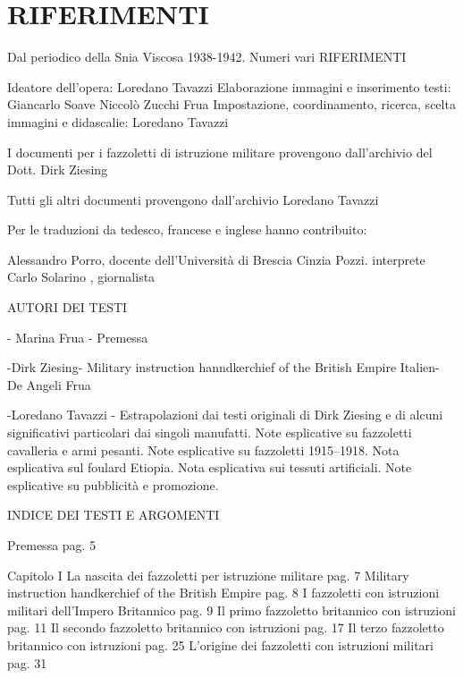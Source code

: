 \chapter[]{RIFERIMENTI}

Dal periodico della Snia Viscosa 1938-1942. Numeri vari
RIFERIMENTI


Ideatore dell’opera: 	                          	  Loredano Tavazzi
Elaborazione immagini e inserimento testi:
     Giancarlo Soave
            Niccolò Zucchi Frua
Impostazione, coordinamento, ricerca, 
scelta immagini e didascalie:                          Loredano Tavazzi                                     



I documenti per i fazzoletti di istruzione militare provengono dall’archivio del Dott. Dirk Ziesing

Tutti gli altri documenti provengono dall’archivio 
 Loredano Tavazzi



Per le traduzioni da tedesco, francese e inglese hanno contribuito:

 Alessandro Porro, 		docente dell’Università di Brescia
Cinzia Pozzi. 						     interprete
Carlo Solarino , 					    giornalista 	







AUTORI DEI TESTI

- Marina Frua -
Premessa


-Dirk Ziesing- 
Military instruction hanndkerchief of the British Empire
Italien- De Angeli Frua


-Loredano Tavazzi -
Estrapolazioni dai testi originali di Dirk Ziesing e di alcuni significativi particolari dai singoli manufatti.
Note esplicative su fazzoletti cavalleria e armi pesanti.
Note esplicative su fazzoletti 1915–1918.
Nota esplicativa sul foulard Etiopia.
Nota esplicativa sui tessuti artificiali.
Note esplicative su pubblicità e promozione.



INDICE DEI TESTI E ARGOMENTI

Premessa 						         pag.   5

Capitolo I
La nascita dei fazzoletti  per  istruzione militare          pag.    7                                  
Military instruction handkerchief
		of the British Empire  				       pag.      8
I fazzoletti con istruzioni militari dell’Impero Britannico  							                    pag.     9                                                        
Il primo fazzoletto britannico con istruzioni                 pag.  11
Il secondo  fazzoletto britannico con istruzioni             pag.  17
Il terzo  fazzoletto britannico con istruzioni                   pag. 25
L’origine dei fazzoletti con istruzioni militari               pag. 31


